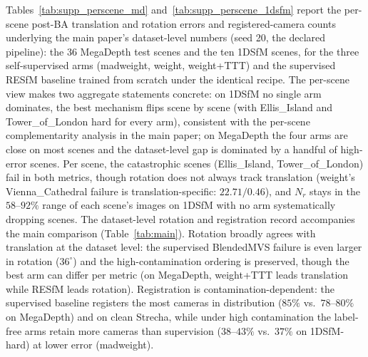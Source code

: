 \documentclass{article}
\renewcommand{\deg}{^{\circ}}
\begin{document}
Tables~\ref{tab:supp_perscene_md} and~\ref{tab:supp_perscene_1dsfm} report the per-scene
post-BA translation and rotation errors and registered-camera counts underlying the
main paper's dataset-level numbers (seed 20, the declared pipeline): the 36 MegaDepth test scenes and the ten 1DSfM
scenes, for the three self-supervised arms (madweight, weight, weight+TTT) and the
supervised RESfM baseline trained from scratch under the identical
recipe. The per-scene view makes two aggregate statements concrete: on 1DSfM no single
arm dominates, the best mechanism flips scene by scene (with Ellis\_Island and
Tower\_of\_London hard for every arm), consistent with the per-scene complementarity
analysis in the main paper; on MegaDepth the four arms are close on most scenes and the
dataset-level gap is dominated by a handful of high-error scenes. Per scene, the
catastrophic scenes (Ellis\_Island, Tower\_of\_London) fail in both metrics, though
rotation does not always track translation (weight's Vienna\_Cathedral failure is
translation-specific: $22.71/0.46$), and $N_r$ stays in the $58$--$92\%$ range of each scene's images on 1DSfM
with no arm systematically dropping scenes.
The dataset-level rotation and registration record accompanies the main comparison (Table~\ref{tab:main}). Rotation broadly agrees with translation
at the dataset level: the supervised BlendedMVS failure is even larger in rotation
($36\deg$) and the high-contamination ordering is preserved, though the best arm can
differ per metric (on MegaDepth, weight+TTT leads translation while RESfM leads
rotation). Registration is contamination-dependent: the supervised baseline registers
the most cameras in distribution ($85\%$ vs.\ $78$--$80\%$ on MegaDepth) and on clean
Strecha, while under high contamination the label-free arms retain more cameras than
supervision ($38$--$43\%$ vs.\ $37\%$ on 1DSfM-hard) at lower error (madweight).
\end{document}
